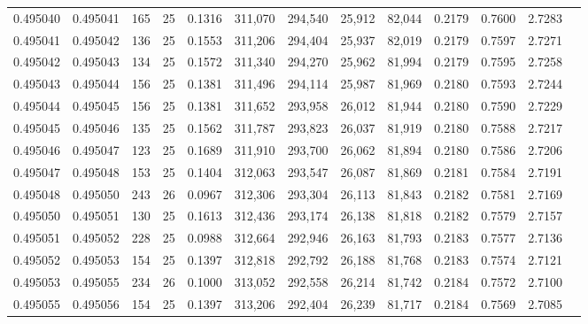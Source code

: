 \begin{tabular}{rrrrrrrrrrrrr}
0.495040 & 0.495041 &   165 &  25 &                                     0.1316 & 311,070 & 294,540 &  25,912 &  82,044 & 0.2179 & 0.7600 & 2.7283 \\
0.495041 & 0.495042 &   136 &  25 &                                     0.1553 & 311,206 & 294,404 &  25,937 &  82,019 & 0.2179 & 0.7597 & 2.7271 \\
0.495042 & 0.495043 &   134 &  25 &                                     0.1572 & 311,340 & 294,270 &  25,962 &  81,994 & 0.2179 & 0.7595 & 2.7258 \\
0.495043 & 0.495044 &   156 &  25 &                                     0.1381 & 311,496 & 294,114 &  25,987 &  81,969 & 0.2180 & 0.7593 & 2.7244 \\
0.495044 & 0.495045 &   156 &  25 &                                     0.1381 & 311,652 & 293,958 &  26,012 &  81,944 & 0.2180 & 0.7590 & 2.7229 \\
0.495045 & 0.495046 &   135 &  25 &                                     0.1562 & 311,787 & 293,823 &  26,037 &  81,919 & 0.2180 & 0.7588 & 2.7217 \\
0.495046 & 0.495047 &   123 &  25 &                                     0.1689 & 311,910 & 293,700 &  26,062 &  81,894 & 0.2180 & 0.7586 & 2.7206 \\
0.495047 & 0.495048 &   153 &  25 &                                     0.1404 & 312,063 & 293,547 &  26,087 &  81,869 & 0.2181 & 0.7584 & 2.7191 \\
0.495048 & 0.495050 &   243 &  26 &                                     0.0967 & 312,306 & 293,304 &  26,113 &  81,843 & 0.2182 & 0.7581 & 2.7169 \\
0.495050 & 0.495051 &   130 &  25 &                                     0.1613 & 312,436 & 293,174 &  26,138 &  81,818 & 0.2182 & 0.7579 & 2.7157 \\
0.495051 & 0.495052 &   228 &  25 &                                     0.0988 & 312,664 & 292,946 &  26,163 &  81,793 & 0.2183 & 0.7577 & 2.7136 \\
0.495052 & 0.495053 &   154 &  25 &                                     0.1397 & 312,818 & 292,792 &  26,188 &  81,768 & 0.2183 & 0.7574 & 2.7121 \\
0.495053 & 0.495055 &   234 &  26 &                                     0.1000 & 313,052 & 292,558 &  26,214 &  81,742 & 0.2184 & 0.7572 & 2.7100 \\
0.495055 & 0.495056 &   154 &  25 &                                     0.1397 & 313,206 & 292,404 &  26,239 &  81,717 & 0.2184 & 0.7569 & 2.7085 \\

\end{tabular}

